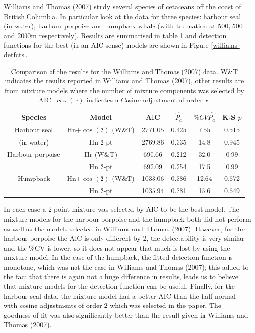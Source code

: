 \documentclass[useAMS,referee, usegraphicx]{biom}
\begin{document}
Williams and Thomas (2007) study several species of cetaceans off the coast of British Columbia. In particular look at the data for three species: harbour seal (in water), harbour porpoise and humpback whale (with truncation at 500, 500 and 2000m respectively). Results are summarised in table \ref{williams-table} and detection functions for the best (in an AIC sense) models are shown in Figure \ref{williams-detfcts}.

\begin{table}
\caption{Comparison of the results for the Williams and Thomas (2007) data. W\&T indicates the results reported in Williams and Thomas (2007), other results are from mixture models where the number of mixture components was selected by AIC. $\cos(x)$ indicates a Cosine adjustment of order $x$.}
\centering
\begin{tabular}{c c c c c c}
\hline \hline
Species & Model & AIC & $\hat{P_a}$ & $\% CV \hat{P_a}$ & K-S $p$\\
\hline
Harbour seal & Hn+$\cos(2)$ (W\&T) & 2771.05 & 0.425 & 7.55 & 0.515\\
(in water) & Hn 2-pt  & 2769.86 & 0.335 & 14.8 & 0.945\\
Harbour porpoise & Hr (W\&T) & 690.66 & 0.212 & 32.0 & 0.99\\
 & Hn 2-pt & 692.09 & 0.254 & 17.5 & 0.99\\
Humpback & Hn+$\cos(2)$ (W\&T) & 1033.06 & 0.386 & 12.64 & 0.672 \\
 & Hn 2-pt & 1035.94 & 0.381 & 15.6 & 0.649 \\
\hline
\end{tabular}
\label{williams-table}
\end{table}

In each case a 2-point mixture was selected by AIC to be the best model. The mixture models for the harbour porpoise and the humpback both did not perform as well as the models selected in Williams and Thomas (2007). However, for the harbour porpoise the AIC is only different by 2, the detectability is very similar and the \%CV is lower, so it does not appear that much is lost by using the mixture model. In the case of the humpback, the fitted detection function is monotone, which was not the case in Williams and Thomas (2007); this added to the fact that there is again not a huge difference in results, leads us to believe that mixture models for the detection function can be useful. Finally, for the harbour seal data, the mixture model had a better AIC than the half-normal with cosine adjustments of order 2 which was selected in the paper. The goodness-of-fit was also significantly better than the result given in Williams and Thomas (2007).
\end{document}
